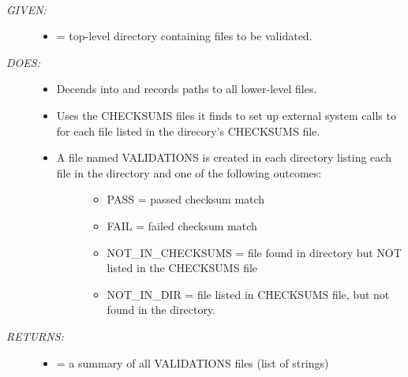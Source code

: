 \documentclass[letterpaper,10pt,english]{sphinxmanual}
\begin{document}
\begin{fulllineitems}
\label{code:gfunc.ensembl_data.validate_downloads}~\begin{description}
\item[{\emph{GIVEN:}}] \leavevmode\begin{itemize}
\item {} 
 = top-level directory containing files to be validated.

\end{itemize}

\item[{\emph{DOES:}}] \leavevmode\begin{itemize}
\item {} 
Decends into  and records paths to all lower-level files.

\item {} 
Uses the CHECKSUMS files it finds to set up external system calls to 
for each file listed in the direcory's CHECKSUMS file.

\item {} \begin{description}
\item[{A file named VALIDATIONS is created in each directory listing each file in the directory and one of the following outcomes: }] \leavevmode\begin{itemize}
\item {} 
PASS = passed checksum match

\item {} 
FAIL = failed checksum match

\item {} 
NOT\_IN\_CHECKSUMS = file found in directory but NOT listed in the CHECKSUMS file

\item {} 
NOT\_IN\_DIR = file listed in CHECKSUMS file, but not found in the directory.

\end{itemize}

\end{description}

\end{itemize}

\item[{\emph{RETURNS:}}] \leavevmode\begin{itemize}
\item {} 
 = a summary of all VALIDATIONS files (list of strings)

\end{itemize}

\end{description}

\end{fulllineitems}
\end{document}
